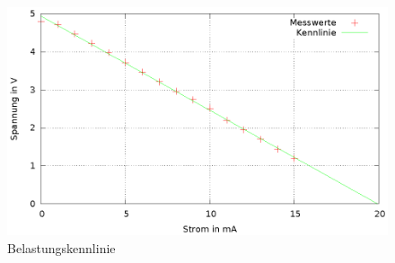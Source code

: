 \documentclass[
a4paper,     %
 headsepline, %
11pt         %
]{scrartcl}  %
\begin{document}
\begin{figure}[hbtp]
\caption{Belastungskennlinie}
\centering
\includegraphics[scale=1]{belastungskennlinie.eps}
\end{figure}






% 

% 
\end{document}
